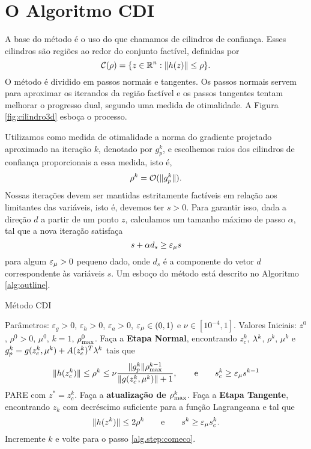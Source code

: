 \section{O Algoritmo CDI}

A base do método é o uso do que chamamos de cilindros de confiança.
Esses cilindros são regiões ao redor do conjunto factível, definidas
por
\begin{equation}\visiblelbl{def:cilindro}
 \mathcal{C}(\rho) = \{z \in \Rn{n} : \norma{h(z)} \leq \rho\}.
\end{equation}
O método é dividido em passos normais e tangentes. Os passos
normais servem para aproximar os iterandos da região factível e
os passos tangentes tentam melhorar o progresso dual, segundo uma medida de
otimalidade.
A Figura \ref{fig:cilindro3d} esboça o processo.

Utilizamos como medida de otimalidade a norma do gradiente projetado
aproximado na itera\c{c}\~ao $k$, denotado por $g_p^k$, e 
escolhemos raios dos cilindros de confiança proporcionais a essa medida, isto é,
$$ \rho^k = \mathcal{O}(\Vert g_p^k\Vert). $$
Nossas itera\c{c}\~oes devem ser mantidas estritamente fact\'iveis em
rela\c{c}\~ao aos limitantes das vari\'aveis, isto \'e, devemos ter $s >
0$. 
Para garantir isso, dada a direção $d$ a partir de um ponto $z$, calculamos um
tamanho máximo de passo $\alpha$, tal que a nova itera\c{c}\~ao satisfaça
\begin{equation}\visiblelbl{eq:slim}
s + \alpha d_s \geq \epsmu s
\end{equation}
para algum $\varepsilon_{\mu} > 0$ pequeno dado, onde $d_s$ é
a componente do vetor $d$ correspondente às variáveis $s$. 
Um esboço do método está descrito no Algoritmo \ref{alg:outline}.
\begin{algorithm}[H]
\caption{Método CDI}
\begin{algorithmic}[1]
\State Parâmetros: $\varepsilon_g > 0$, $\varepsilon_h > 0$, $\varepsilon_a >
0$, $\varepsilon_{\mu} \in (0,1)$ e $\nu \in [10^{-4},1]$.
\State Valores Iniciais: $z^0$, $\rho^0 > 0$, $\mu^0$, $k = 1$, $\rho_{\max}^0$.
\State {}Faça a {\bf Etapa Normal}, encontrando $z_c^k$,
  $\lambda^{k}$, $\rho^k$, $\mu^k$ e $g_p^k = g(z_c^k,\mu^k) + A(z_c^k)^T\lambda^{k}$
  tais que 
    $$ \Vert h(z_c^k)\Vert \leq \rho^k \leq \nu \frac{\Vert g_p^k\Vert\rho_{\max}^{k-1}}
    {\Vert g(z_c^{k},\mu^k)\Vert + 1}, \qquad \mbox{e} \qquad s_c^k \geq \varepsilon_{\mu}
    s^{k-1} $$
  \State PARE com $z^* = z_c^k$.
\EndIf
\State Faça a {\bf atualização de $\rho_{\max}^k$}.
\State Faça a {\bf Etapa Tangente}, encontrando $z_k$ com decréscimo suficiente
para a função Lagrangeana e tal que 
$$ \Vert h(z^k)\Vert \leq 2\rho^k \qquad \mbox{e} \qquad s^k \geq \varepsilon_{\mu} s_c^k. $$
\State Incremente $k$ e volte para o passo \ref{alg.step:comeco}.
\end{algorithmic}
\end{algorithm}
